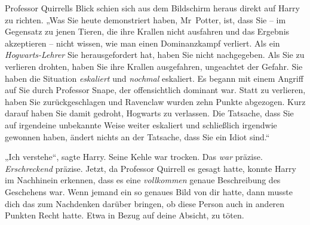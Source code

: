 Professor Quirrells Blick schien sich aus dem Bildschirm heraus direkt auf Harry zu richten. „Was Sie heute demonstriert haben, Mr~Potter, ist, dass Sie – im Gegensatz zu jenen Tieren, die ihre Krallen nicht ausfahren und das Ergebnis akzeptieren – nicht wissen, wie man einen Dominanzkampf verliert. Als ein \emph{Hogwarts-Lehrer} Sie herausgefordert hat, haben Sie nicht nachgegeben. Als Sie zu verlieren drohten, haben Sie ihre Krallen ausgefahren, ungeachtet der Gefahr. Sie haben die Situation \emph{eskaliert} und \emph{nochmal} eskaliert. Es begann mit einem Angriff auf Sie durch Professor Snape, der offensichtlich dominant war. Statt zu verlieren, haben Sie zurückgeschlagen und Ravenclaw wurden zehn Punkte abgezogen. Kurz darauf haben Sie damit gedroht, Hogwarts zu verlassen. Die Tatsache, dass Sie auf irgendeine unbekannte Weise weiter eskaliert und schließlich irgendwie gewonnen haben, ändert nichts an der Tatsache, dass Sie ein Idiot sind.“

„Ich verstehe“, sagte Harry. Seine Kehle war trocken. Das \emph{war} präzise. \emph{Erschreckend} präzise. Jetzt, da Professor Quirrell es gesagt hatte, konnte Harry im Nachhinein erkennen, dass es eine \emph{vollkommen} genaue Beschreibung des Geschehens war. Wenn jemand ein so genaues Bild von dir hatte, dann musste dich das zum Nachdenken darüber bringen, ob diese Person auch in anderen Punkten Recht hatte. Etwa in Bezug auf deine Absicht, zu töten.

